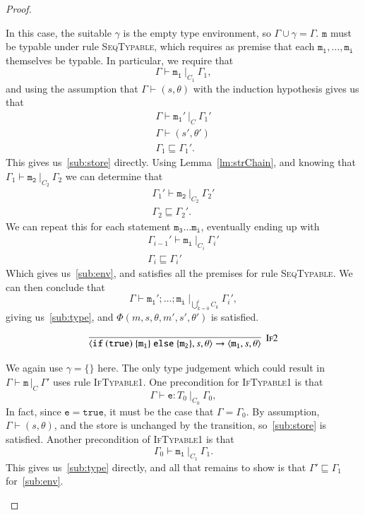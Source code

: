 \documentclass[12pt,a4paper,twoside,openright]{report}
\theoremstyle{definition}
\theoremstyle{dotless}
\newcommand{\typable}[2][ ]{\Gamma{}\vdash\mathtt{#2}\, |_C#1\:\Gamma#1'}
\newcommand{\transition}[6]{\langle{}\mathtt{#1},#2,#3\rangle{}\rightarrow{}\langle{}\mathtt{#4},#5,#6\rangle}
\begin{document}
\begin{proof}
\begin{case}[Seq2]
	In this case, the suitable $\gamma$ is the empty type environment, so 
	$\Gamma\!\cup\!\gamma=\Gamma$. $\mathtt{m}$ must
	be typable under rule \textsc{SeqTypable}, which requires as premise that
	each $\mathtt{m_1}, \dots, \mathtt{m_i}$ themselves be typable. In particular, we
	require that 
	$$\Gamma\vdash\mathtt{m_1}\ |_{C_1}\ \Gamma_1,$$ 
	and using the assumption that $\Gamma\vdash(s,\theta)$ with the induction hypothesis gives us that
	\begin{gather*}
	\Gamma\vdash\mathtt{m_1'}\ |_{C}\ \Gamma_1' \\
	\Gamma\vdash(s',\theta') \\
	\Gamma_1\sqsubseteq\Gamma_1'.
  \end{gather*}
  	This gives us~\eqref{sub:store} directly. Using
	Lemma~\ref{lm:strChain}, and knowing that $\Gamma_1\vdash\mathtt{m_2}\ |_{C_2}\ \Gamma_2$
   	we can determine that 
	\begin{gather*}
	  \Gamma_1'\vdash\mathtt{m_2}\ |_{C_2}\ \Gamma_2' \\
	  \Gamma_2\sqsubseteq\Gamma_2'.
  	\end{gather*}
	We can repeat this for each statement $\mathtt{m_3\dots m_i}$, eventually ending up with
	\begin{gather*}
		\Gamma_{i-1}'\vdash\mathtt{m_i}\ |_{C_i}\ \Gamma_i' \\
		\Gamma_i\sqsubseteq\Gamma_i'
	\end{gather*}
	Which gives us~\eqref{sub:env}, and satisfies all the premises for rule
	\textsc{SeqTypable}. We can then conclude that 
	$$\Gamma\vdash\mathtt{m_1'; \dots; m_i}\ |_{\bigcup_{k=0}^i{C_k}}\ \Gamma_i',$$
	giving us~\eqref{sub:type}, and $\Phi(m,s,\theta,m',s',\theta')$ is satisfied.
  
  \end{case}

  \begin{case}[If2]
	$$\infer[\textsc{If2}]{
	  \transition{if\ (true)\ \{m_1\}\ else\ \{m_2\}}{s}{\theta}{m_1}{s}{\theta}
	}{}$$

	We again use $\gamma=\{\}$ here. The only type judgement which could result in $\typable{m}$ uses rule
	\textsc{IfTypable1}. One precondition for \textsc{IfTypable1} is that
	$$\Gamma\vdash\mathtt{e}:T_0\ |_{C_0}\ \Gamma_0,$$ 
	In fact, since $\mathtt{e} = \mathtt{true}$, it must be the case that $\Gamma=\Gamma_0$.
	By assumption, $\Gamma\vdash(s,\theta)$, and the store is unchanged by the transition, so~\eqref{sub:store}
	is satisfied. Another precondition of \textsc{IfTypable1} is that 
	$$\Gamma_0\vdash\mathtt{m_1}\ |_{C_1}\ \Gamma_1.$$
	This gives us~\eqref{sub:type} directly, and all that remains to show is
	that $\Gamma'\sqsubseteq \Gamma_1$ for~\eqref{sub:env}.


\end{case}
\end{proof}
\end{document}
